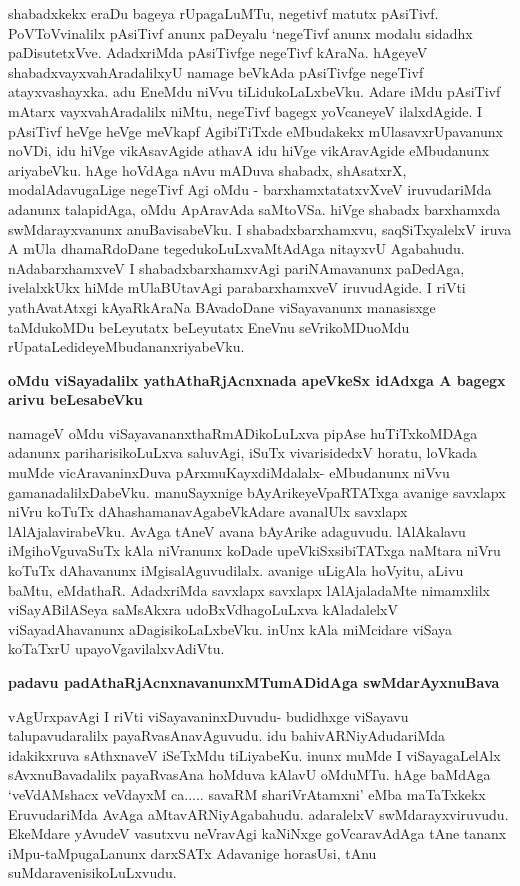 shabadxkekx eraDu bageya rUpagaLuMTu, negetivf matutx pAsiTivf. PoVToVvinalilx pAsiTivf anunx paDeyalu `negeTivf anunx modalu sidadhx paDisutetxVve. AdadxriMda pAsiTivfge negeTivf kAraNa. hAgeyeV shabadxvayxvahAradalilxyU namage beVkAda pAsiTivfge negeTivf atayxvashayxka. adu EneMdu niVvu tiLidukoLaLxbeVku. Adare iMdu pAsiTivf mAtarx vayxvahAradalilx niMtu, negeTivf bagegx yoVcaneyeV ilalxdAgide. I pAsiTivf heVge heVge meVkapf AgibiTiTxde eMbudakekx mUlasavxrUpavanunx noVDi, idu hiVge vikAsavAgide athavA idu hiVge vikAravAgide eMbudanunx ariyabeVku. hAge hoVdAga nAvu mADuva shabadx, shAsatxrX, modalAdavugaLige negeTivf Agi oMdu - barxhamxtatatxvXveV iruvudariMda adanunx talapidAga, oMdu ApAravAda saMtoVSa. hiVge shabadx barxhamxda swMdarayxvanunx anuBavisabeVku. I shabadxbarxhamxvu, saqSiTxyalelxV iruva A mUla dhamaRdoDane tegedukoLuLxvaMtAdAga nitayxvU Agabahudu. nAdabarxhamxveV I shabadxbarxhamxvAgi pariNAmavanunx paDedAga, ivelalxkUkx hiMde mUlaBUtavAgi parabarxhamxveV iruvudAgide. I riVti yathAvatAtxgi kAyaRkAraNa BAvadoDane viSayavanunx manasisxge taMdukoMDu beLeyutatx beLeyutatx EneVnu seVrikoMDuoMdu rUpataLedideyeMbudananxriyabeVku.

{\bf oMdu viSayadalilx yathAthaRjAcnxnada apeVkeSx idAdxga A bagegx arivu beLesabeVku}

namageV oMdu viSayavananxthaRmADikoLuLxva pipAse huTiTxkoMDAga adanunx pariharisikoLuLxva saluvAgi, iSuTx vivarisidedxV horatu, loVkada muMde vicAravaninxDuva pArxmuKayxdiMdalalx- eMbudanunx niVvu gamanadalilxDabeVku. manuSayxnige bAyArikeyeVpaRTATxga avanige savxlapx niVru koTuTx dAhashamanavAgabeVkAdare avanalUlx savxlapx lAlAjalavirabeVku. AvAga tAneV avana bAyArike adaguvudu. lAlAkalavu iMgihoVguvaSuTx kAla niVranunx koDade upeVkiSxsibiTATxga naMtara niVru koTuTx dAhavanunx iMgisalAguvudilalx. avanige uLigAla hoVyitu, aLivu baMtu, eMdathaR. AdadxriMda savxlapx savxlapx lAlAjaladaMte nimamxlilx viSayABilASeya saMsAkxra udoBxVdhagoLuLxva kAladalelxV viSayadAhavanunx aDagisikoLaLxbeVku. inUnx kAla miMcidare viSaya koTaTxrU upayoVgavilalxvAdiVtu.

{\bf padavu padAthaRjAcnxnavanunxMTumADidAga swMdarAyxnuBava}

vAgUrxpavAgi I riVti viSayavaninxDuvudu- budidhxge viSayavu talupavudaralilx payaRvasAnavAguvudu. idu bahivARNiyAdudariMda idakikxruva sAthxnaveV iSeTxMdu tiLiyabeKu. inunx muMde I viSayagaLelAlx sAvxnuBavadalilx payaRvasAna hoMduva kAlavU oMduMTu. hAge baMdAga `veVdAMshacx veVdayxM ca..... savaRM shariVrAtamxni' eMba maTaTxkekx EruvudariMda AvAga aMtavARNiyAgabahudu. adaralelxV swMdarayxviruvudu. EkeMdare yAvudeV vasutxvu neVravAgi kaNiNxge goVcaravAdAga tAne tananx iMpu-taMpugaLanunx darxSATx Adavanige horasUsi, tAnu suMdaravenisikoLuLxvudu.

